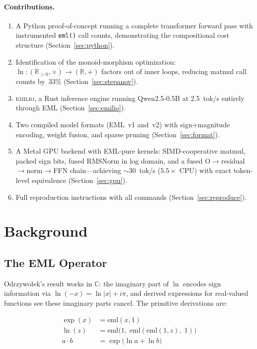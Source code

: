 \documentclass[acmsmall,nonacm]{acmart}
\begin{document}
\paragraph{Contributions.}
\begin{enumerate}
\item A Python proof-of-concept running a complete transformer forward
  pass with instrumented \texttt{eml()} call counts, demonstrating the
  compositional cost structure (Section~\ref{sec:python}).
\item Identification of the monoid-morphism optimization:
  $\ln\colon(\mathbb{R}_{>0},\times)\to(\mathbb{R},+)$ factors out of
  inner loops, reducing matmul call counts by~33\%
  (Section~\ref{sec:stepanov}).
\item \textsc{emilio}, a Rust inference engine running Qwen2.5-0.5B at
  2.5~tok/s entirely through EML (Section~\ref{sec:emilio}).
\item Two compiled model formats (EML~v1 and~v2) with sign+magnitude
  encoding, weight fusion, and sparse pruning
  (Section~\ref{sec:format}).
\item A Metal GPU backend with EML-pure kernels: SIMD-cooperative
  matmul, packed sign bits, fused RMSNorm in log domain, and a
  fused O$\to$residual$\to$norm$\to$FFN chain---achieving
  $\sim$30~tok/s ($5.5\times$ CPU) with exact token-level
  equivalence (Section~\ref{sec:gpu}).
\item Full reproduction instructions with all commands
  (Section~\ref{sec:reproduce}).
\end{enumerate}


\section{Background}
\label{sec:background}

\subsection{The EML Operator}

Odrzywołek's result \cite{odrzywołek2026} works in $\mathbb{C}$: the
imaginary part of $\ln$ encodes sign information via $\ln(-x) = \ln|x|
+ i\pi$, and derived expressions for real-valued functions see these
imaginary parts cancel.  The primitive derivations are:

\begin{align}
  \exp(x) &= \mathrm{eml}(x, 1) \label{eq:exp} \\
  \ln(z)  &= \mathrm{eml}\!\big(1,\;\mathrm{eml}(\mathrm{eml}(1,z),\;1)\big) \label{eq:ln} \\
  a \cdot b &= \exp\!\big(\ln a + \ln b\big) \label{eq:mul}
\end{align}
\end{document}
